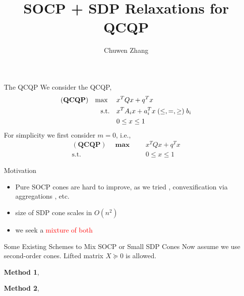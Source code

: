 \documentclass[aspectratio=1610, 10pt]{beamer}
\newcommand{\model}[1]{(\textbf{#1})}
\newcommand{\mx}{\mathbf{\max}\;}
\newcommand{\red}[1]{\textcolor{red}{#1}}
\begin{document}
\title{SOCP + SDP Relaxations for QCQP}

\author{
  Chuwen Zhang
}


\maketitle
\begin{frame}{The QCQP}
  We consider the QCQP,
  \begin{equation}
    \label{eq:inhoqcqp}
    \begin{aligned}
      \model{QCQP} \quad \mx \quad & x^T Qx + q^T x                                    \\
      \textrm{s.t.} \quad          & x^T A_i x + a_i^T x \hspace{0.27em} (\le, =, \ge)
      \hspace{0.27em} b_i                                                              \\
                                   & 0 \le x \le 1
    \end{aligned}
  \end{equation}
  For simplicity we first consider \(m = 0\), i.e.,
  \begin{equation}
    \label{eq:inhoqcqp.box}
    \begin{aligned}
      \model{QCQP} \quad \mx \quad & x^T Qx + q^T x \\
      \textrm{s.t.} \quad          & 0 \le x \le 1
    \end{aligned}
  \end{equation}
\end{frame}
\begin{frame}[allowframebreaks]{Motivation}
  \begin{itemize}
    \item Pure SOCP cones are hard to improve, as we tried \cite{bienstock_cutting-planes_2014}, convexification via aggregations \cite{burer_how_2017}, etc.
    \item size of SDP cone scales in \(O(n^2)\)
    \item we seek a \red{mixture of both}
  \end{itemize}
\end{frame}
\begin{frame}[allowframebreaks]{Some Existing Schemes to Mix SOCP or Small SDP Cones}
  Now assume we use second-order cones. Lifted matrix \(X \succeq 0\) is allowed.

  \textbf{Method 1},

  \textbf{Method 2},

\end{frame}
\end{document}
